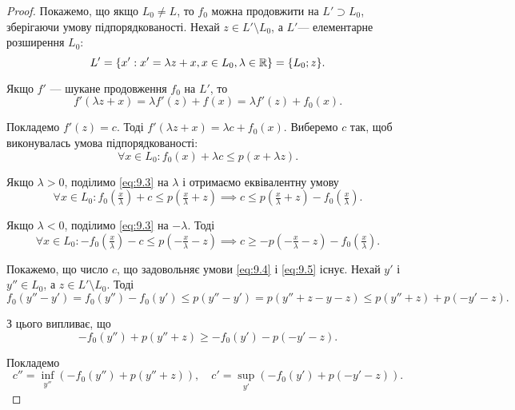 \begin{proof}
Покажемо, що якщо $L_0 \ne L$, то $f_0$ можна
продовжити на $L' \supset L_0$, зберігаючи умову підпорядкованості.
Нехай $z \in L' \setminus L_0$, а $L'$--- елементарне розширення $L_0$:
\begin{equation*}
    L' = \{x': x' = \lambda z + x, x \in L_0, \lambda \in \mathbb{R}\} = \{L_0; z\}.
\end{equation*}

Якщо $f'$ --- шукане продовження $f_0$ на $L'$, то
\begin{equation*}
    f'(\lambda z + x) = \lambda f'(z) + f(x) = \lambda f'(z) + f_0(x).
\end{equation*}

Покладемо $f'(z) = c$. Тоді $f'(\lambda z + x) = \lambda c + f_0(x)$. Виберемо
$c$ так, щоб виконувалась умова підпорядкованості:
\begin{equation}
    \label{eq:9.3}
    \forall x \in L_0: f_0(x) + \lambda c \le p(x + \lambda z).
\end{equation}

Якщо $\lambda > 0$, поділимо \eqref{eq:9.3} на $\lambda$ і отримаємо еквівалентну
умову
\begin{equation}
    \label{eq:9.4}
    \forall x \in L_0: f_0(\tfrac{x}{\lambda}) + c \le p(\tfrac{x}{\lambda} + z) \implies
    c \le p(\tfrac{x}{\lambda} + z) - f_0(\tfrac{x}{\lambda}).
\end{equation}

Якщо $\lambda < 0$, поділимо \eqref{eq:9.3} на $-\lambda$. Тоді
\begin{equation}
    \label{eq:9.5}
    \forall x \in L_0: -f_0(\tfrac{x}{\lambda}) - c \le p(-\tfrac{x}{\lambda} - z) \implies
    c \ge -p(-\tfrac{x}{\lambda} - z) - f_0(\tfrac{x}{\lambda}).
\end{equation}

Покажемо, що число $c$, що задовольняє умови \eqref{eq:9.4} і \eqref{eq:9.5} існує.
Нехай $y'$ і $y'' \in L_0$, а $z \in L' \setminus L_0$. Тоді
\begin{equation*}
    f_0(y'' - y') = f_0(y'') - f_0(y') \le p(y'' - y') =
    p(y'' + z - y - z) \le p(y'' + z) + p(-y' - z).
\end{equation*}

З цього випливає, що
\begin{equation*}
    -f_0(y'') + p(y'' + z) \ge -f_0(y') - p(-y' - z).
\end{equation*}

Покладемо
\begin{equation*}
    c'' = \inf_{y''} (-f_0(y'') + p(y'' + z)), \quad c' = \sup_{y'} (-f_0(y') + p(-y' - z)). 
\end{equation*}


\end{proof}
